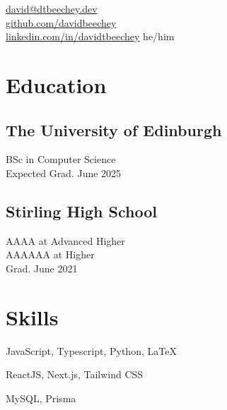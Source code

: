 \documentclass[]{hieudo-build}
\begin{document}
%
%
{
	\faEnvelope \href{mailto:david@dtbeechey.dev}{ david@dtbeechey.dev}\\
	\faGithub \href{https://github.com/davidbeechey}{ github.com/davidbeechey}\\
	\faLinkedinSquare \href{https://www.linkedin.com/in/davidtbeechey}{ linkedin.com/in/davidtbeechey}
}{he/him}
    
%
%
\begin{minipage}[t]{0.36\textwidth} 

\section{Education} 

\subsection{The University of Edinburgh}
BSc in Computer Science \\
Expected Grad. June 2025 \\
\minisectionsep

\subsection{Stirling High School}
AAAA at Advanced Higher \\
AAAAAA at Higher \\
Grad. June 2021 \\
\minisectionsep

\section{Skills}
JavaScript, Typescript, Python, \LaTeX \\ 
\minisectionsep

ReactJS, Next.js, Tailwind CSS \\
\minisectionsep

MySQL, Prisma \\
\minisectionsep


\end{minipage}
\end{document}
